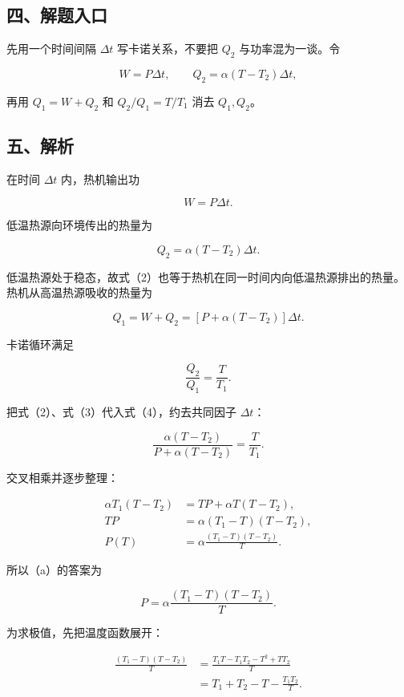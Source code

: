 \documentclass[12pt,a4paper,UTF8]{ctexart}
\begin{document}
\subsection{四、解题入口}\label{ux56dbux89e3ux9898ux5165ux53e3-2}

先用一个时间间隔 \(\Delta t\) 写卡诺关系，不要把 \(Q_2\)
与功率混为一谈。令

\[
W=P\Delta t,
\qquad
Q_2=\alpha(T-T_2)\Delta t,
\]

再用 \(Q_1=W+Q_2\) 和 \(Q_2/Q_1=T/T_1\) 消去 \(Q_1,Q_2\)。

\subsection{五、解析}\label{ux4e94ux89e3ux6790-2}

在时间 \(\Delta t\) 内，热机输出功

\[
W=P\Delta t. \tag{1}
\]

低温热源向环境传出的热量为

\[
Q_2=\alpha(T-T_2)\Delta t. \tag{2}
\]

低温热源处于稳态，故式（2）也等于热机在同一时间内向低温热源排出的热量。热机从高温热源吸收的热量为

\[
Q_1=W+Q_2
=\left[P+\alpha(T-T_2)\right]\Delta t. \tag{3}
\]

卡诺循环满足

\[
\frac{Q_2}{Q_1}=\frac{T}{T_1}. \tag{4}
\]

把式（2）、式（3）代入式（4），约去共同因子 \(\Delta t\)：

\[
\frac{\alpha(T-T_2)}{P+\alpha(T-T_2)}
=\frac{T}{T_1}. \tag{5}
\]

交叉相乘并逐步整理：

\[
\begin{aligned}
\alpha T_1(T-T_2)
&=TP+\alpha T(T-T_2),\\
TP
&=\alpha(T_1-T)(T-T_2),\\
P(T)
&=\alpha\frac{(T_1-T)(T-T_2)}{T}.
\end{aligned} \tag{6}
\]

所以（a）的答案为

\[
\boxed{
P=\alpha\frac{(T_1-T)(T-T_2)}{T}
}. \tag{7}
\]

为求极值，先把温度函数展开：

\[
\begin{aligned}
\frac{(T_1-T)(T-T_2)}{T}
&=\frac{T_1T-T_1T_2-T^2+TT_2}{T}\\
&=T_1+T_2-T-\frac{T_1T_2}{T}.
\end{aligned} \tag{8}
\]
\end{document}
